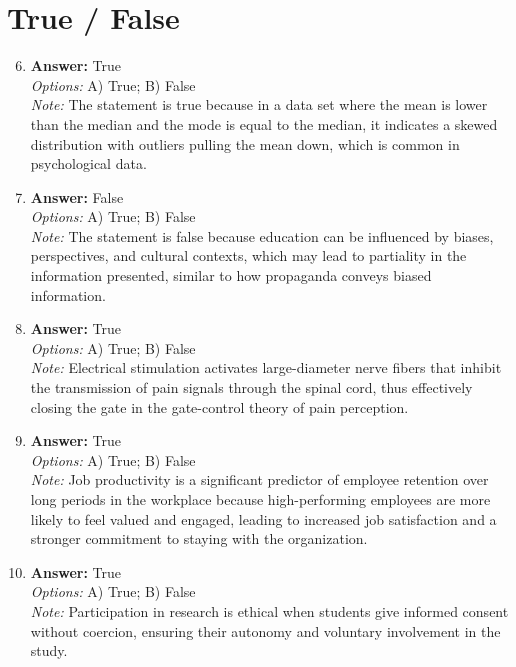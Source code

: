 \documentclass[12pt]{article}
\begin{document}
\section*{True / False}
\begin{enumerate}[label=\arabic*.]
\setcounter{enumi}{5}
\item \textbf{Answer:} True
\\ \textit{Options:} A) True; B) False
\\ \textit{Note:} The statement is true because in a data set where the mean is lower than the median and the mode is equal to the median, it indicates a skewed distribution with outliers pulling the mean down, which is common in psychological data.
\item \textbf{Answer:} False
\\ \textit{Options:} A) True; B) False
\\ \textit{Note:} The statement is false because education can be influenced by biases, perspectives, and cultural contexts, which may lead to partiality in the information presented, similar to how propaganda conveys biased information.
\item \textbf{Answer:} True
\\ \textit{Options:} A) True; B) False
\\ \textit{Note:} Electrical stimulation activates large-diameter nerve fibers that inhibit the transmission of pain signals through the spinal cord, thus effectively closing the gate in the gate-control theory of pain perception.
\item \textbf{Answer:} True
\\ \textit{Options:} A) True; B) False
\\ \textit{Note:} Job productivity is a significant predictor of employee retention over long periods in the workplace because high-performing employees are more likely to feel valued and engaged, leading to increased job satisfaction and a stronger commitment to staying with the organization.
\item \textbf{Answer:} True
\\ \textit{Options:} A) True; B) False
\\ \textit{Note:} Participation in research is ethical when students give informed consent without coercion, ensuring their autonomy and voluntary involvement in the study.
\end{enumerate}
\end{document}
